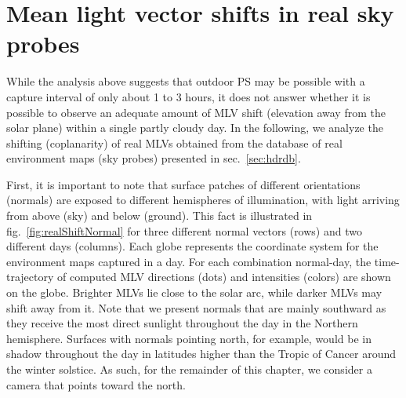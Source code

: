 \section{Mean light vector shifts in real sky probes}



While the analysis above suggests that outdoor PS may be possible with a capture interval of only about 1 to 3 hours, it does not answer whether it is possible to observe an adequate amount of MLV shift (elevation away from the solar plane) within a single partly cloudy day. In the following, we analyze the shifting (coplanarity) of real MLVs obtained from the database of real environment maps (sky probes) presented in sec.~\ref{sec:hdrdb}.


First, it is important to note that surface patches of different orientations (normals) are exposed to different hemispheres of illumination, with light arriving from above (sky) and below (ground). This fact is illustrated in fig.~\ref{fig:realShiftNormal} for three different normal vectors (rows) and two different days (columns). Each globe represents the coordinate system for the environment maps captured in a day. For each combination normal-day, the time-trajectory of computed MLV directions (dots) and intensities (colors) are shown on the globe. Brighter MLVs lie close to the solar arc, while darker MLVs may shift away from it. Note that we present normals that are mainly southward as they receive the most direct sunlight throughout the day in the Northern hemisphere. Surfaces with normals pointing north, for example, would be in shadow throughout the day in latitudes higher than the Tropic of Cancer around the winter solstice. As such, for the remainder of this chapter, we consider a camera that points toward the north.

